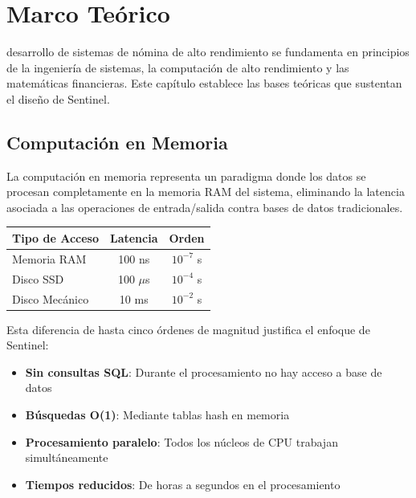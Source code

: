 \chapter{Marco Teórico}

 desarrollo de sistemas de nómina de alto rendimiento se fundamenta en principios de la ingeniería de sistemas, la computación de alto rendimiento y las matemáticas financieras. Este capítulo establece las bases teóricas que sustentan el diseño de Sentinel.

\section{Computación en Memoria}

La computación en memoria representa un paradigma donde los datos se procesan completamente en la memoria RAM del sistema, eliminando la latencia asociada a las operaciones de entrada/salida contra bases de datos tradicionales.

\begin{center}
\begin{tabular}{lcc}
\toprule
\textbf{Tipo de Acceso} & \textbf{Latencia} & \textbf{Orden} \\
\midrule
Memoria RAM & 100 ns & $10^{-7}$ s \\
Disco SSD & 100 $\mu$s & $10^{-4}$ s \\
Disco Mecánico & 10 ms & $10^{-2}$ s \\
\bottomrule
\end{tabular}
\end{center}

Esta diferencia de hasta cinco órdenes de magnitud justifica el enfoque de Sentinel:

\begin{itemize}
    \item \textbf{Sin consultas SQL}: Durante el procesamiento no hay acceso a base de datos
    \item \textbf{Búsquedas O(1)}: Mediante tablas hash en memoria
    \item \textbf{Procesamiento paralelo}: Todos los núcleos de CPU trabajan simultáneamente
    \item \textbf{Tiempos reducidos}: De horas a segundos en el procesamiento
\end{itemize}

